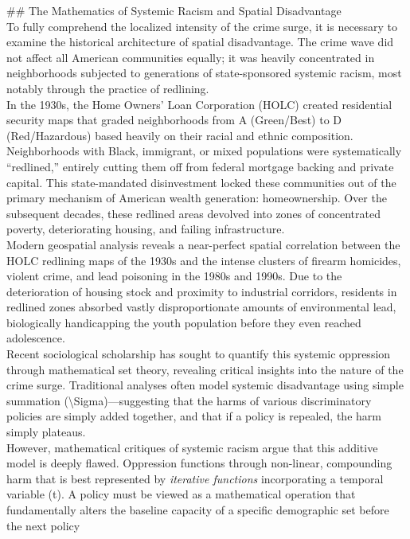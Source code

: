 \documentclass[
]{article}
\begin{document}
\#\# The Mathematics of Systemic Racism and Spatial Disadvantage\\
To fully comprehend the localized intensity of the crime surge, it is
necessary to examine the historical architecture of spatial
disadvantage. The crime wave did not affect all American communities
equally; it was heavily concentrated in neighborhoods subjected to
generations of state-sponsored systemic racism, most notably through the
practice of redlining.\\
In the 1930s, the Home Owners' Loan Corporation (HOLC) created
residential security maps that graded neighborhoods from A (Green/Best)
to D (Red/Hazardous) based heavily on their racial and ethnic
composition. Neighborhoods with Black, immigrant, or mixed populations
were systematically ``redlined,'' entirely cutting them off from federal
mortgage backing and private capital. This state-mandated disinvestment
locked these communities out of the primary mechanism of American wealth
generation: homeownership. Over the subsequent decades, these redlined
areas devolved into zones of concentrated poverty, deteriorating
housing, and failing infrastructure.\\
Modern geospatial analysis reveals a near-perfect spatial correlation
between the HOLC redlining maps of the 1930s and the intense clusters of
firearm homicides, violent crime, and lead poisoning in the 1980s and
1990s. Due to the deterioration of housing stock and proximity to
industrial corridors, residents in redlined zones absorbed vastly
disproportionate amounts of environmental lead, biologically
handicapping the youth population before they even reached
adolescence.\\
Recent sociological scholarship has sought to quantify this systemic
oppression through mathematical set theory, revealing critical insights
into the nature of the crime surge. Traditional analyses often model
systemic disadvantage using simple summation
(\textbackslash Sigma)---suggesting that the harms of various
discriminatory policies are simply added together, and that if a policy
is repealed, the harm simply plateaus.\\
However, mathematical critiques of systemic racism argue that this
additive model is deeply flawed. Oppression functions through
non-linear, compounding harm that is best represented by \emph{iterative
functions} incorporating a temporal variable (t). A policy must be
viewed as a mathematical operation that fundamentally alters the
baseline capacity of a specific demographic set before the next policy
\end{document}
